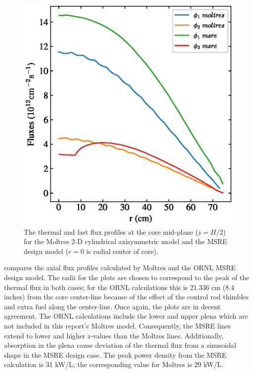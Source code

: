 \documentclass{article}
\makeatletter
\def\maxwidth#1{\ifdim\Gin@nat@width>#1 #1\else\Gin@nat@width\fi}
\makeatother
\begin{document}
\begin{figure}[htpb]
    \centering
      \includegraphics[width=\maxwidth{\textwidth}]{combined_msre_moltres_radial.eps}
      \caption{The thermal and fast flux profiles at the core mid-plane
        ($z=H/2$) for the Moltres 2-D cylindrical axisymmetric model and the
        \gls{MSRE} design model \cite[p. 92]{briggs_molten-salt_1964} ($r=0$ is
        radial center of core).}
    \label{fig:radial_fluxes_compare}
\end{figure}

 compares the axial flux profiles calculated by
Moltres and the \gls{ORNL} \gls{MSRE} design model. The radii for the plots are
chosen to correspond to the peak of the thermal flux in both cases; for the
\gls{ORNL} calculations this is 21.336 cm (8.4 inches) from the core center-line because of
the effect of the control rod thimbles and extra fuel along the
center-line. Once again, the plots are in decent agreement. The \gls{ORNL}
calculations include the lower and upper plena which are not included in this
report's Moltres model. Consequently, the \gls{MSRE} lines extend to lower and
higher z-values than the Moltres lines. Additionally, absorption
in the plena cause deviation of the thermal flux from a sinusoidal shape in the
\gls{MSRE} design case. The peak power density from the \gls{MSRE} calculation
is 31 kW/L; the corresponding value for Moltres is 29 kW/L.
\end{document}
